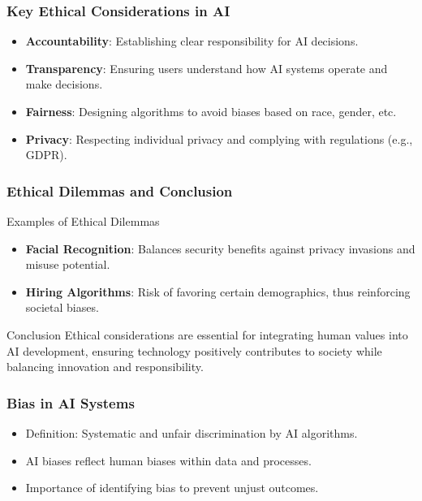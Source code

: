 \documentclass{beamer}
\begin{document}
\begin{frame}[fragile]
    \frametitle{Key Ethical Considerations in AI}
    \begin{itemize}
        \item \textbf{Accountability}: Establishing clear responsibility for AI decisions.
        \item \textbf{Transparency}: Ensuring users understand how AI systems operate and make decisions.
        \item \textbf{Fairness}: Designing algorithms to avoid biases based on race, gender, etc.
        \item \textbf{Privacy}: Respecting individual privacy and complying with regulations (e.g., GDPR).
    \end{itemize}
\end{frame}

\begin{frame}[fragile]
    \frametitle{Ethical Dilemmas and Conclusion}
    \begin{block}{Examples of Ethical Dilemmas}
        \begin{itemize}
            \item \textbf{Facial Recognition}: Balances security benefits against privacy invasions and misuse potential.
            \item \textbf{Hiring Algorithms}: Risk of favoring certain demographics, thus reinforcing societal biases.
        \end{itemize}
    \end{block}
    
    \begin{block}{Conclusion}
        Ethical considerations are essential for integrating human values into AI development, ensuring technology positively contributes to society while balancing innovation and responsibility.
    \end{block}
\end{frame}

\begin{frame}[fragile]
    \frametitle{Bias in AI Systems}
    \begin{itemize}
        \item Definition: Systematic and unfair discrimination by AI algorithms.
        \item AI biases reflect human biases within data and processes.
        \item Importance of identifying bias to prevent unjust outcomes.
    \end{itemize}
\end{frame}
\end{document}
